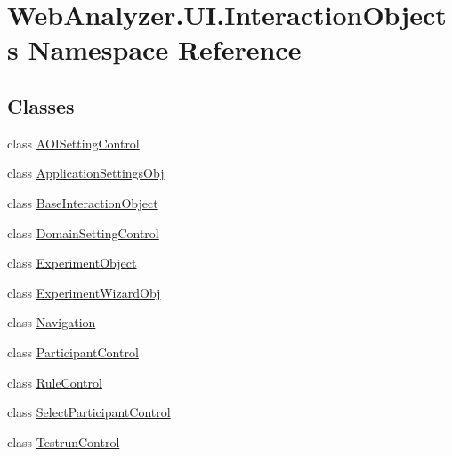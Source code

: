 \hypertarget{namespace_web_analyzer_1_1_u_i_1_1_interaction_objects}{}\section{Web\+Analyzer.\+U\+I.\+Interaction\+Objects Namespace Reference}
\label{namespace_web_analyzer_1_1_u_i_1_1_interaction_objects}
\subsection*{Classes}
\begin{DoxyCompactItemize}
\item 
class \hyperlink{class_web_analyzer_1_1_u_i_1_1_interaction_objects_1_1_a_o_i_setting_control}{A\+O\+I\+Setting\+Control}
\item 
class \hyperlink{class_web_analyzer_1_1_u_i_1_1_interaction_objects_1_1_application_settings_obj}{Application\+Settings\+Obj}
\item 
class \hyperlink{class_web_analyzer_1_1_u_i_1_1_interaction_objects_1_1_base_interaction_object}{Base\+Interaction\+Object}
\item 
class \hyperlink{class_web_analyzer_1_1_u_i_1_1_interaction_objects_1_1_domain_setting_control}{Domain\+Setting\+Control}
\item 
class \hyperlink{class_web_analyzer_1_1_u_i_1_1_interaction_objects_1_1_experiment_object}{Experiment\+Object}
\item 
class \hyperlink{class_web_analyzer_1_1_u_i_1_1_interaction_objects_1_1_experiment_wizard_obj}{Experiment\+Wizard\+Obj}
\item 
class \hyperlink{class_web_analyzer_1_1_u_i_1_1_interaction_objects_1_1_navigation}{Navigation}
\item 
class \hyperlink{class_web_analyzer_1_1_u_i_1_1_interaction_objects_1_1_participant_control}{Participant\+Control}
\item 
class \hyperlink{class_web_analyzer_1_1_u_i_1_1_interaction_objects_1_1_rule_control}{Rule\+Control}
\item 
class \hyperlink{class_web_analyzer_1_1_u_i_1_1_interaction_objects_1_1_select_participant_control}{Select\+Participant\+Control}
\item 
class \hyperlink{class_web_analyzer_1_1_u_i_1_1_interaction_objects_1_1_testrun_control}{Testrun\+Control}
\end{DoxyCompactItemize}
